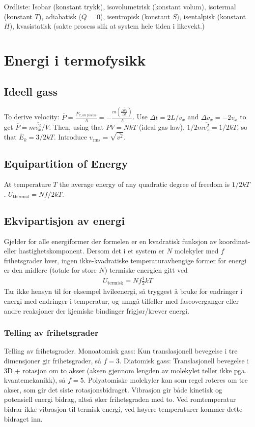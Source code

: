 \documentclass[12pt]{article}
\begin{document}
Ordliste: Isobar (konstant trykk), isovolumetrisk (konstant volum), isotermal (konstant $T$), adiabatisk ($Q$ = 0), isentropisk (konstant $S$), isentalpisk (konstant $H$), kvasistatisk (sakte prosess slik at system hele tiden i likevekt.)
\section{Energi i termofysikk}
\subsection{Ideell gass}
To derive velocity:
$
\overline{P}=\frac{\overline{F}_{x,on\ piston}}{A}=-\frac{m\left(\overline{\frac{\Delta v_x}{\Delta t}}\right)}{A}
$.
Use $\Delta t = 2L/v_x$ and $\Delta v_x=-2v_x$ to get $\overline{P}=m\overline{v_x^2}/V$. Then, using that $PV=NkT$ (ideal gas law), $1/2 m\overline{v_x^2} = 1/2kT$, so that $\overline{E}_k=3/2 kT$. Introduce $v_{\mathrm{rms}}=\sqrt{\overline{v^2}}$.
\subsection{Equipartition of Energy}
At temperature $T$ the average energy of any quadratic degree of freedom is $1/2 kT$. $U_{\mathrm{thermal}}=Nf/2 kT$.
\subsection{Ekvipartisjon av energi}
Gjelder for alle energiformer der formelen er en kvadratisk funksjon av koordinat-
eller hastighetskomponent. Dersom det i et system er $N$ molekyler med $f$
frihetsgrader hver, ingen ikke-kvadratiske temperaturavhengige former for energi
er den midlere (totale for store $N$) termiske energien gitt ved
\begin{align*}
  U_\text{termisk} = N f \frac{1}{2}kT
\end{align*}
Tar ikke hensyn til for eksempel hvileenergi, så tryggest å bruke for endringer
i energi med endringer i temperatur, og unngå tilfeller med faseoverganger
eller andre reaksjoner der kjemiske bindinger frigjør/krever energi.

\subsubsection{Telling av frihetsgrader}
Telling av frihetsgrader. Monoatomisk gass: Kun translasjonell bevegelse i tre
dimensjoner gir frihetsgrader, så $f = 3$. Diatomisk gass: Translasjonell
bevegelse i 3D + rotasjon om to akser (aksen gjennom lengden av molekylet
teller ikke pga. kvantemekanikk), så $f = 5$. Polyatomiske molekyler kan som
regel roteres om tre akser, som gir det siste rotasjonsbidraget. Vibrasjon
gir både kinetisk og potensiell energi bidrag, altså øker frihetsgraden med to.
Ved romtemperatur bidrar ikke vibrasjon til termisk energi, ved høyere temperaturer
kommer dette bidraget inn.
\end{document}
